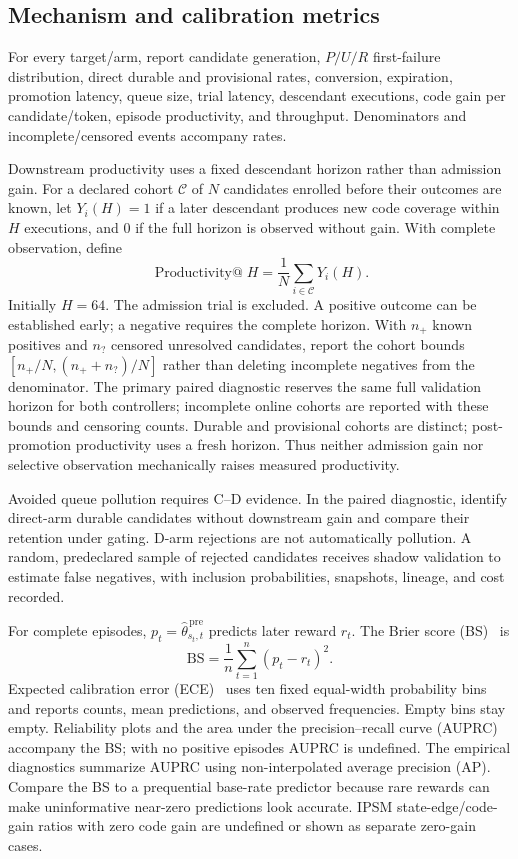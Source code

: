 \documentclass[final,5p,times,number]{elsarticle}
\begin{document}
\subsection{Mechanism and calibration metrics}
For every target/arm, report candidate generation, $P/U/R$ first-failure distribution, direct durable and provisional rates, conversion, expiration, promotion latency, queue size, trial latency, descendant executions, code gain per candidate/token, episode productivity, and throughput. Denominators and incomplete/censored events accompany rates.

Downstream productivity uses a fixed descendant horizon rather than admission gain. For a declared cohort $\mathcal{C}$ of $N$ candidates enrolled before their outcomes are known, let $Y_i(H)=1$ if a later descendant produces new code coverage within $H$ executions, and $0$ if the full horizon is observed without gain. With complete observation, define
\begin{equation}
\operatorname{Productivity@}H=\frac{1}{N}\sum_{i\in\mathcal{C}}Y_i(H).
\end{equation}
Initially $H=64$. The admission trial is excluded. A positive outcome can be established early; a negative requires the complete horizon. With $n_+$ known positives and $n_?$ censored unresolved candidates, report the cohort bounds $[n_+/N,(n_++n_?)/N]$ rather than deleting incomplete negatives from the denominator. The primary paired diagnostic reserves the same full validation horizon for both controllers; incomplete online cohorts are reported with these bounds and censoring counts. Durable and provisional cohorts are distinct; post-promotion productivity uses a fresh horizon. Thus neither admission gain nor selective observation mechanically raises measured productivity.

Avoided queue pollution requires C--D evidence. In the paired diagnostic, identify direct-arm durable candidates without downstream gain and compare their retention under gating. D-arm rejections are not automatically pollution. A random, predeclared sample of rejected candidates receives shadow validation to estimate false negatives, with inclusion probabilities, snapshots, lineage, and cost recorded.

For complete episodes, $p_t=\widehat{\theta}_{s_t,t}^{\,\mathrm{pre}}$ predicts later reward $r_t$. The Brier score (BS)~\cite{brier1950} is
\begin{equation}
\mathrm{BS}=\frac{1}{n}\sum_{t=1}^{n}(p_t-r_t)^2.
\end{equation}
Expected calibration error (ECE)~\cite{guo2017calibration} uses ten fixed equal-width probability bins and reports counts, mean predictions, and observed frequencies. Empty bins stay empty. Reliability plots and the area under the precision--recall curve (AUPRC)~\cite{davis2006pr} accompany the BS; with no positive episodes AUPRC is undefined. The empirical diagnostics summarize AUPRC using non-interpolated average precision (AP). Compare the BS to a prequential base-rate predictor because rare rewards can make uninformative near-zero predictions look accurate. IPSM state-edge/code-gain ratios with zero code gain are undefined or shown as separate zero-gain cases.
\end{document}
